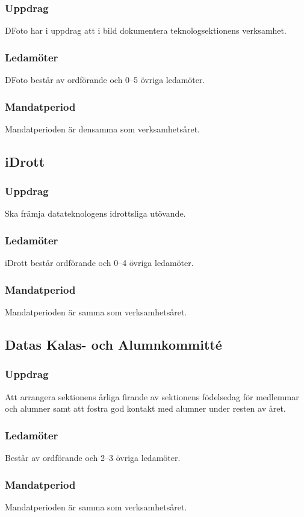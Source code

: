\subsubsection{Uppdrag}
DFoto har i uppdrag att i bild dokumentera teknologsektionens verksamhet.
\subsubsection{Ledamöter}
DFoto består av ordförande och 0--5 övriga ledamöter.
\subsubsection{Mandatperiod}
Mandatperioden är densamma som verksamhetsåret.

\subsection{iDrott}
\subsubsection{Uppdrag}
Ska främja datateknologens idrottsliga utövande. 
\subsubsection{Ledamöter}
iDrott består ordförande och 0--4 övriga ledamöter. 
\subsubsection{Mandatperiod}
Mandatperioden är samma som verksamhetsåret. 

\subsection{Datas Kalas- och Alumnkommitté}
\subsubsection{Uppdrag}
Att arrangera sektionens årliga firande av sektionens födelsedag för medlemmar och alumner samt att fostra god kontakt med alumner under resten av året.
\subsubsection{Ledamöter}
Består av ordförande och 2--3 övriga ledamöter.
\subsubsection{Mandatperiod}
Mandatperioden är samma som verksamhetsåret.


